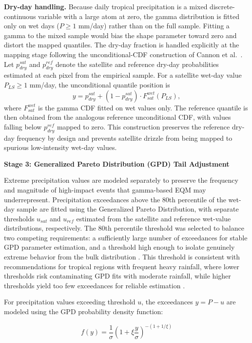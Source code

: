 \documentclass[
]{article}
\begin{document}
\textbf{Dry-day handling.} Because daily tropical precipitation is a
mixed discrete-continuous variable with a large atom at zero, the gamma
distribution is fitted only on wet days (\(P \geq 1\) mm/day) rather
than on the full sample. Fitting a gamma to the mixed sample would bias
the shape parameter toward zero and distort the mapped quantiles. The
dry-day fraction is handled explicitly at the mapping stage following
the unconditional-CDF construction of Cannon et al.~\cite{ref11}. Let
\(p_{dry}^{sat}\) and \(p_{dry}^{ref}\) denote the satellite and
reference dry-day probabilities estimated at each pixel from the
empirical sample. For a satellite wet-day value \(P_{LS} \geq 1\)
mm/day, the unconditional quantile position is
\[y = p_{dry}^{sat} + (1 - p_{dry}^{sat}) \cdot F_{sat}^{wet}(P_{LS}),\]
where \(F_{sat}^{wet}\) is the gamma CDF fitted on wet values only. The
reference quantile is then obtained from the analogous reference
unconditional CDF, with values falling below \(p_{dry}^{ref}\) mapped to
zero. This construction preserves the reference dry-day frequency by
design and prevents satellite drizzle from being mapped to spurious
low-intensity wet-day values.

\textbf{Stage 3: Generalized Pareto Distribution (GPD) Tail Adjustment}

Extreme precipitation values are modeled separately to preserve the
frequency and magnitude of high-impact events that gamma-based EQM may
underrepresent. Precipitation exceedances above the 80th percentile of
the wet-day sample are fitted using the Generalized Pareto Distribution,
with separate thresholds \(u_{sat}\) and \(u_{ref}\) estimated from the
satellite and reference wet-value distributions, respectively. The 80th
percentile threshold was selected to balance two competing requirements:
a sufficiently large number of exceedances for stable GPD parameter
estimation, and a threshold high enough to isolate genuinely extreme
behavior from the bulk distribution \cite{ref7}. This threshold is
consistent with recommendations for tropical regions with frequent heavy
rainfall, where lower thresholds risk contaminating GPD fits with
moderate rainfall, while higher thresholds yield too few exceedances for
reliable estimation \cite{ref25}.

For precipitation values exceeding threshold \(u\), the exceedances
\(y = P - u\) are modeled using the GPD probability density function:

\[f(y) = \frac{1}{\sigma} \left( 1 + \xi \frac{y}{\sigma} \right)^{-(1 + 1/\xi)}\]
\end{document}
